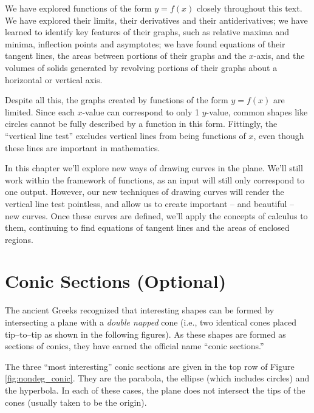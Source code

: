 We have explored functions of the form $y=f(x)$ closely throughout this text. We have explored their limits, their derivatives and their antiderivatives; we have learned to identify key features of their graphs, such as relative maxima and minima, inflection points and asymptotes; we have found equations of their tangent lines, the areas between portions of their graphs and the $x$-axis, and the volumes of solids generated by revolving portions of their graphs about a horizontal or vertical axis.

Despite all this, the graphs created by functions of the form $y=f(x)$ are limited. Since each $x$-value can correspond to only 1 $y$-value, common shapes like circles cannot be fully described by a function in this form.  Fittingly, the ``vertical line test''  excludes vertical lines from being functions of $x$, even though these lines are important in mathematics.

In this chapter we'll explore new ways of drawing curves in the plane. We'll still work within the framework of functions, as an input will still only correspond to one output. However, our new techniques of drawing curves will render the vertical line test pointless, and allow us to create important -- and beautiful -- new curves. Once these curves are defined, we'll apply the concepts of calculus to them, continuing to find equations of tangent lines and the areas of enclosed regions. 

\enlargethispage{15\baselineskip}

\section{Conic Sections (Optional)}\label{sec:conic_sections}

The ancient Greeks recognized that interesting shapes can be formed by intersecting a plane with a 
\textit{double napped} cone (i.e., two identical cones placed tip--to--tip as shown in the following figures). As these shapes are formed as sections of conics, they have earned the official name ``conic sections.''

The three ``most interesting\primeskip'' conic sections are given in the top row of Figure \ref{fig:nondeg_conic}. They are the parabola, the ellipse (which includes circles) and the hyperbola. In each of these cases, the plane does not intersect the tips of the cones (usually taken to be the origin). \\


